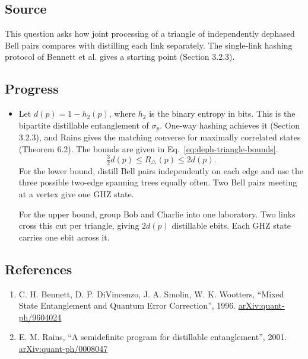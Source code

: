 \subsection*{Source}

This question asks how joint processing of a triangle of independently dephased Bell pairs compares with distilling each link separately. The single-link hashing protocol of Bennett et al. gives a starting point  (Section 3.2.3).

\subsection*{Progress}

\begin{itemize}
  \item Let $d(p)=1-h_2(p)$, where $h_2$ is the binary entropy in bits. This is the bipartite distillable entanglement of $\sigma_p$. One-way hashing achieves it  (Section 3.2.3), and Rains gives the matching converse for maximally correlated states  (Theorem 6.2). The bounds are given in Eq.~\eqref{eq:deph-triangle-bounds}.
\begin{equation}
  \tfrac32 d(p)\leq R_\triangle(p)\leq 2d(p).
  \label{eq:deph-triangle-bounds}
\end{equation}
For the lower bound, distill Bell pairs independently on each edge and use the three possible two-edge spanning trees equally often. Two Bell pairs meeting at a vertex give one GHZ state.

For the upper bound, group Bob and Charlie into one laboratory. Two links cross this cut per triangle, giving $2d(p)$ distillable ebits. Each GHZ state carries one ebit across it.
\end{itemize}

\subsection*{References}

\begin{enumerate}[label={},leftmargin=4.8em,labelsep=0.5em]
  \footnotesize
  \item[\textup{[BDSW96]}]\label{ref:feb9b5-bdsw96}
  C. H. Bennett, D. P. DiVincenzo, J. A. Smolin, W. K. Wootters, “Mixed State Entanglement and Quantum Error Correction”, 1996.
\href{https://arxiv.org/abs/quant-ph/9604024}{arXiv:quant-ph/9604024}

  \item[\textup{[Rai01]}]\label{ref:feb9b5-rai01}
  E. M. Rains, “A semidefinite program for distillable entanglement”, 2001.
\href{https://arxiv.org/abs/quant-ph/0008047}{arXiv:quant-ph/0008047}
\end{enumerate}

